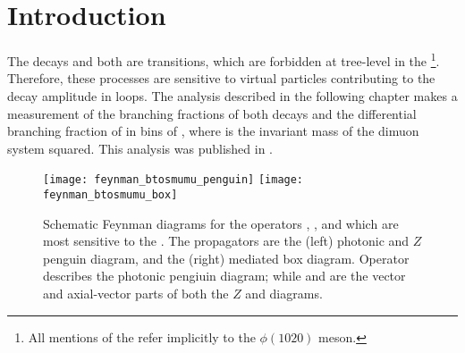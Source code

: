 \section{Introduction}

The decays \btokpipimumu and \btophikmumu both are \decay{\bquark}{\squark\mumu} \fcnc
transitions, which are forbidden at tree-level in the \sm\footnote{All mentions of the \phii
  refer implicitly to the $\phi(1020)$ meson.
}.
Therefore, these processes are sensitive to virtual \np particles contributing
to the decay amplitude in loops.
The analysis described in the following chapter makes a measurement of the branching fractions of
both decays and the differential branching
fraction of \btokpipimumu in bins of \qsq, where \qsq is the invariant mass of the dimuon system
squared.
This analysis was published in .



\begin{figure}
  \begin{center}
    \texttt{[image: feynman\_btosmumu\_penguin]}
    \texttt{[image: feynman\_btosmumu\_box]}
    \caption[Schematic Feynman diagrams for FCNCs]
    {
      Schematic Feynman diagrams for the operators , , and  which are most sensitive
      to the \decay{\bquark}{\squark\mumu} \fcnc.
      The propagators are the (left) photonic and $Z$ penguin diagram, and the (right) \Wp mediated
      box diagram.
      Operator  describes the photonic pengiuin diagram; while  and  are the
      vector and axial-vector parts of both the $Z$ and \Wp diagrams.
    }
    \label{fig:hhh:loops}
  \end{center}
\end{figure}

